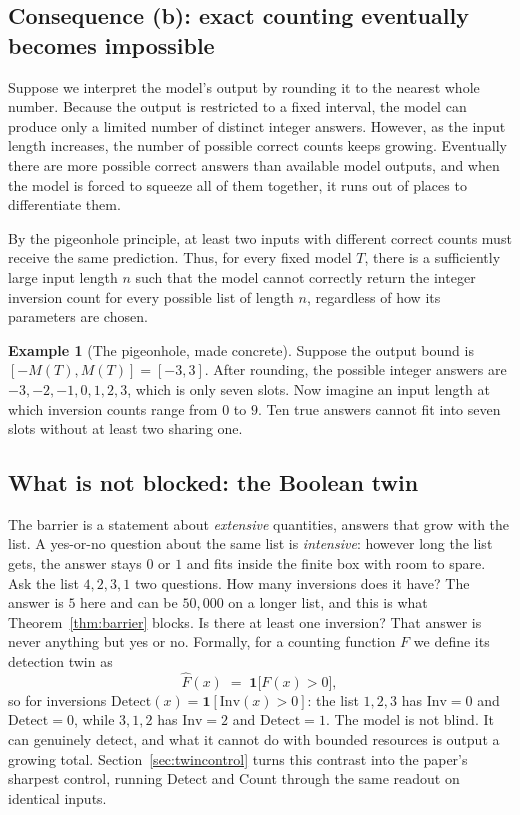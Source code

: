 \documentclass[10pt]{article}
\theoremstyle{definition}
\newtheorem{example}{Example}
\newcommand{\Inv}{\mathrm{Inv}}
\begin{document}
\subsection{Consequence (b): exact counting eventually becomes impossible}
\label{sec:conseq-b}

Suppose we interpret the model's output by rounding it to the nearest
whole number. Because the output is restricted to a fixed interval, the
model can produce only a limited number of distinct integer answers.
However, as the input length increases, the number of possible correct
counts keeps growing. Eventually there are more possible correct answers
than available model outputs, and when the model is forced to squeeze all
of them together, it runs out of places to differentiate them.

By the pigeonhole principle, at least two inputs with different correct
counts must receive the same prediction. Thus, for every fixed model $T$,
there is a sufficiently large input length $n$ such that the model cannot
correctly return the integer inversion count for every possible list of
length $n$, regardless of how its parameters are chosen.

\begin{example}[The pigeonhole, made concrete]
Suppose the output bound is $[-M(T), M(T)] = [-3, 3]$. After rounding, the
possible integer answers are $-3, -2, -1, 0, 1, 2, 3$, which is only seven
slots.
Now imagine an input length at which inversion counts range from $0$ to
$9$. Ten true answers cannot fit into seven slots without at least two
sharing one.
\end{example}

\subsection{What is not blocked: the Boolean twin}
\label{sec:dichotomy}

The barrier is a statement about \emph{extensive} quantities, answers that
grow with the list. A yes-or-no question about the same list is
\emph{intensive}: however long the list gets, the answer stays $0$ or $1$
and fits inside the finite box with room to spare. Ask the list
$4, 2, 3, 1$ two questions. How many inversions does it have? The answer
is $5$ here and can be $50{,}000$ on a longer list, and this is what
Theorem~\ref{thm:barrier} blocks. Is there at least one inversion? That
answer is never anything but yes or no. Formally, for a counting function
$F$ we define its detection twin as
\begin{equation}
\hat{F}(x) \;=\; \mathbf{1}\big[F(x) > 0\big],
\label{eq:detect}
\end{equation}
so for inversions $\mathrm{Detect}(x) = \mathbf{1}[\Inv(x) > 0]$: the list
$1,2,3$ has $\Inv = 0$ and $\mathrm{Detect} = 0$, while $3,1,2$ has
$\Inv = 2$ and $\mathrm{Detect} = 1$. The model is not blind. It can
genuinely detect, and what it cannot do with bounded resources is output a
growing total. Section~\ref{sec:twincontrol} turns this contrast into the
paper's sharpest control, running Detect and Count through the same
readout on identical inputs.
\end{document}
